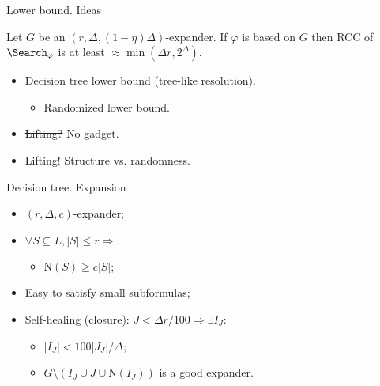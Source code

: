 \begin{frame}{Lower bound. Ideas}

    \begin{theorem}
        Let $G$ be an $(r, \Delta, (1 - \eta) \Delta)$-expander. If
        $\varphi$ is based on $G$ then RCC of $\Search_{\varphi}$ is
        at least $\approx \min(\Delta r, 2^{\Delta})$.
    \end{theorem}

    \pause
    \vspace{0.5cm}
    \begin{itemize}
        \item Decision tree lower bound (tree-like resolution).
            \pause
            \begin{itemize}
                \item \alert{Randomized} lower bound.
            \end{itemize}
            \pause
        \item {} \pause \sout{Lifting?} \alert{No gadget.}
            \pause
        \item Lifting! Structure vs. randomness.
    \end{itemize}
\end{frame}

\begin{frame}{Decision tree. Expansion}

    \begin{minipage}{0.38\linewidth}
        \centering
        
    \end{minipage}
    \begin{minipage}{0.58\linewidth}
        \begin{itemize}
            \item $(r, \Delta, c)$-expander;
            \item $\forall S \subseteq L, |S| \le r \Rightarrow$
                \begin{itemize}
                    \item $\mathrm{N}(S) \ge c |S|$;
                \end{itemize}
        \end{itemize}
    \end{minipage}

    \pause

    \vspace{1cm}
    \begin{itemize}
        \item Easy to satisfy small subformulas;
            \pause
        \item Self-healing (closure): $J < \Delta r / 100 \Rightarrow
            \exists I_J \colon$
            \begin{itemize}
                \item $|I_J| < 100 |J_J| / \Delta$;
                \item $G \setminus (I_J \cup J \cup \mathrm{N}(I_J))$
                    is a good expander.
            \end{itemize}
    \end{itemize}

\end{frame}

